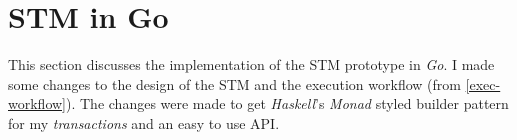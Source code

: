 \documentclass[../main]{subfiles}
\begin{document}
  \section{STM in Go}

  \par
  This section discusses the implementation of the STM prototype in {\em Go}. I made some changes to the design of the STM and the execution workflow (from \ref{exec-workflow}). The changes were made to get {\em Haskell}'s {\em Monad} styled builder pattern for my {\em transactions} and an easy to use API.
\end{document}
